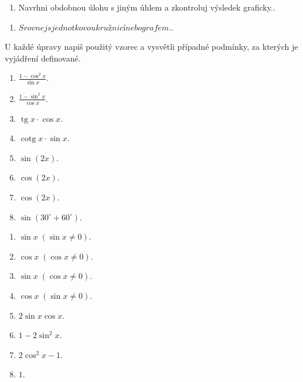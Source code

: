 \documentclass[11pt,a4paper]{article}
\begin{document}
\begin{zadaniReseniBox}[title={Rozšíření 1}]
\begin{enumerate}[label=\alph*)]
\item Navrhni obdobnou úlohu s jiným úhlem a zkontroluj výsledek graficky..
\end{enumerate}
\tcblower
\begin{enumerate}[label=\alph*)]
\item $Srovnej s jednotkovou kružnicí nebo grafem.$.
\end{enumerate}
\end{zadaniReseniBox}
U každé úpravy napiš použitý vzorec a vysvětli případné podmínky, za kterých je vyjádření definované.
\begin{zadaniReseniBox}[title={Domácí úkol}]
\begin{enumerate}[label=\alph*)]
\item $\frac{1-\cos^2x}{\sin x}$.
\item $\frac{1-\sin^2x}{\cos x}$.
\item $\operatorname{tg}x\cdot\cos x$.
\item $\operatorname{cotg}x\cdot\sin x$.
\item $\sin(2x)$.
\item $\cos(2x)$.
\item $\cos(2x)$.
\item $\sin(30^\circ+60^\circ)$.
\end{enumerate}
\tcblower
\begin{enumerate}[label=\alph*)]
\item $\sin x\;(\sin x\ne0)$.
\item $\cos x\;(\cos x\ne0)$.
\item $\sin x\;(\cos x\ne0)$.
\item $\cos x\;(\sin x\ne0)$.
\item $2\sin x\cos x$.
\item $1-2\sin^2x$.
\item $2\cos^2x-1$.
\item $1$.
\end{enumerate}
\end{zadaniReseniBox}
\end{document}
